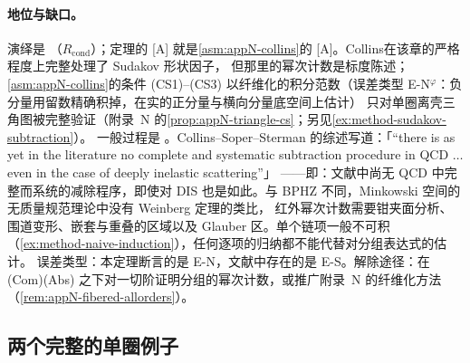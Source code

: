 \paragraph{地位与缺口。}演绎是 \tagR（$R_{\mathrm{cond}}$）；定理的 [A] 就是\cref{asm:appN-collins}的 [A]。Collins\cite[第~10.3、10.8~节]{Collins2011}在该章的严格程度上完整处理了 Sudakov 形状因子，
但那里的幂次计数是标度陈述；\cref{asm:appN-collins}的条件 (CS1)--(CS3) 以纤维化的积分范数（误差类型 E-N$^\varphi$：负分量用留数精确积掉，在实的正分量与横向分量底空间上估计）
只对单圈离壳三角图被完整验证（附录~N 的\cref{prop:appN-triangle-cs}；另见\cref{ex:method-sudakov-subtraction}）。
一般过程是 \tagA。Collins--Soper--Sterman 的综述写道：「“there is as yet in the literature no complete and systematic subtraction procedure in QCD $\ldots$ even in the case of deeply inelastic scattering”」
\cite[第~10.1~节]{CollinsSoperSterman1989}——即：文献中尚无 QCD 中完整而系统的减除程序，即使对 DIS 也是如此。与 BPHZ 不同，Minkowski 空间的无质量规范理论中没有 Weinberg 定理的类比，
红外幂次计数需要钳夹面分析、围道变形、嵌套与重叠的区域以及 Glauber 区。单个链项一般不可积（\cref{ex:method-naive-induction}），任何逐项的归纳都不能代替对分组表达式的估计。
误差类型：本定理断言的是 E-N，文献中存在的是 E-S。解除途径：在 (Com)(Abs) 之下对一切阶证明分组的幂次计数，或推广附录~N 的纤维化方法（\cref{rem:appN-fibered-allorders}）。

\subsection{两个完整的单圈例子}

